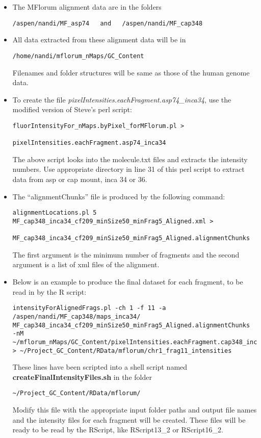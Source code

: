 \documentclass[11pt]{article}
\begin{document}
\begin{enumerate}
\begin{itemize}
\item
The MFlorum alignment data are in the folders
\begin{verbatim}
/aspen/nandi/MF_asp74   and   /aspen/nandi/MF_cap348
\end{verbatim}
\item
All data extracted from these alignment data will be in 
\begin{verbatim}
/home/nandi/mflorum_nMaps/GC_Content
\end{verbatim}
Filenames and folder structures will be same as those of the human genome data. 
\item
To create the file {\it{pixelIntensities.eachFragment.asp74\_inca34}}, use the modified version of Steve's perl script: 
\begin{verbatim}
fluorIntensityFor_nMaps.byPixel_forMFlorum.pl > 
                             pixelIntensities.eachFragment.asp74_inca34
\end{verbatim}
The above script looks into the molecule.txt files and extracts the intensity numbers.
Use appropriate directory in line 31 of this perl script to extract data from asp or cap mount, inca 34 or 36.
\item
The ``alignmentChunks'' file is produced by the following command:
\begin{verbatim}
alignmentLocations.pl 5 MF_cap348_inca34_cf209_minSize50_minFrag5_Aligned.xml > 
		MF_cap348_inca34_cf209_minSize50_minFrag5_Aligned.alignmentChunks
\end{verbatim}
The first argument is the minimum number of fragments and the second argument is a list of xml files of the alignment. 
\item
Below is an example to produce the final dataset for each fragment, to be read in by the R script:
\begin{verbatim}
intensityForAlignedFrags.pl -ch 1 -f 11 -a 
/aspen/nandi/MF_cap348/maps_inca34/
MF_cap348_inca34_cf209_minSize50_minFrag5_Aligned.alignmentChunks 
-nM ~/mflorum_nMaps/GC_Content/pixelIntensities.eachFragment.cap348_inca34 
> ~/Project_GC_Content/RData/mflorum/chr1_frag11_intensities
\end{verbatim}
These lines have been scripted into a shell script named {\bf{createFinalIntensityFiles.sh}} in the folder 
\begin{verbatim} 
~/Project_GC_Content/RData/mflorum/ 
\end{verbatim} 
Modify this file with the appropriate input folder paths and output file names and the intensity files for each fragment will be created. These files will be ready to be read by the RScript, like RScript13\_2 or RScript16\_2. 
\end{itemize}


\end{enumerate}
\end{document}
